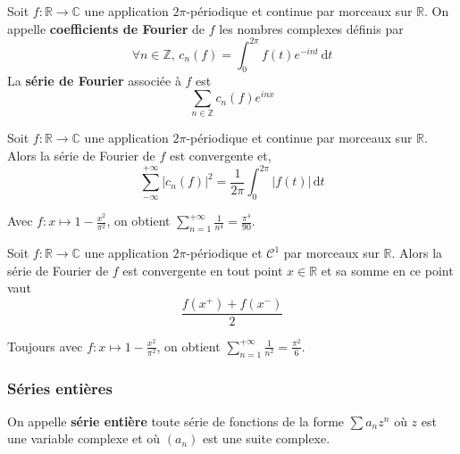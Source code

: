 
  \begin{definition}
    Soit $f : \mathbb{R} \rightarrow \mathbb{C}$ une application $2\pi$-périodique et continue par morceaux sur $\mathbb{R}$. On appelle \textbf{coefficients de Fourier} de $f$ les nombres complexes définis par
    \[ \forall n \in \mathbb{Z}, \, c_n(f) = \int_{0}^{2\pi} f(t) e^{-int} \, \mathrm{d}t \]
    La \textbf{série de Fourier} associée à $f$ est
    \[ \sum_{n \in \mathbb{Z}} c_n(f)e^{inx} \]
  \end{definition}

  \begin{theorem}[Parseval]
    Soit $f : \mathbb{R} \rightarrow \mathbb{C}$ une application $2\pi$-périodique et continue par morceaux sur $\mathbb{R}$. Alors la série de Fourier de $f$ est convergente et,
    \[ \sum_{-\infty}^{+\infty} |c_n(f)|^2 = \frac{1}{2\pi} \int_0^{2\pi} |f(t)| \, \mathrm{d}t \]
  \end{theorem}

  \begin{example}
    Avec $f : x \mapsto 1 - \frac{x^2}{\pi^2}$, on obtient $\sum_{n=1}^{+\infty} \frac{1}{n^4} = \frac{\pi^4}{90}$.
  \end{example}

  \begin{theorem}
    Soit $f : \mathbb{R} \rightarrow \mathbb{C}$ une application $2\pi$-périodique et $\mathcal{C}^1$ par morceaux sur $\mathbb{R}$. Alors la série de Fourier de $f$ est convergente en tout point $x \in \mathbb{R}$ et sa somme en ce point vaut
    \[ \frac{f(x^+) + f(x^-)}{2} \]
  \end{theorem}

  \begin{example}
    Toujours avec $f : x \mapsto 1 - \frac{x^2}{\pi^2}$, on obtient $\sum_{n=1}^{+\infty} \frac{1}{n^2} = \frac{\pi^2}{6}$.
  \end{example}

  \subsubsection{Séries entières}


  \begin{definition}
    On appelle \textbf{série entière} toute série de fonctions de la forme $\sum a_n z^n$ où $z$ est une variable complexe et où $(a_n)$ est une suite complexe.
  \end{definition}

